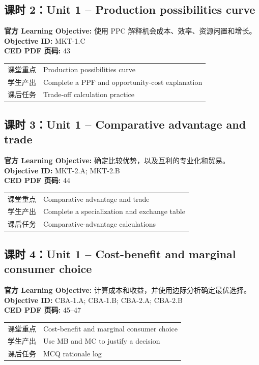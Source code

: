 \documentclass[11pt,a4paper]{ctexart}
\newcommand{\objectivebox}[1]{\noindent\colorbox{aplight}{\parbox{0.96\textwidth}{#1}}}
\begin{document}
\subsection{课时 2：Unit 1 -- Production possibilities curve}
\objectivebox{\textbf{官方 Learning Objective:} 使用 PPC 解释机会成本、效率、资源闲置和增长。\\\textbf{Objective ID:} MKT-1.C\\\textbf{CED PDF 页码:} 43}\par\vspace{0.4em}
\begin{tabularx}{\textwidth}{p{3.0cm}Y}
\toprule
课堂重点 & Production possibilities curve\\
学生产出 & Complete a PPF and opportunity-cost explanation\\
课后任务 & Trade-off calculation practice\\
\bottomrule
\end{tabularx}
\subsection{课时 3：Unit 1 -- Comparative advantage and trade}
\objectivebox{\textbf{官方 Learning Objective:} 确定比较优势，以及互利的专业化和贸易。\\\textbf{Objective ID:} MKT-2.A; MKT-2.B\\\textbf{CED PDF 页码:} 44}\par\vspace{0.4em}
\begin{tabularx}{\textwidth}{p{3.0cm}Y}
\toprule
课堂重点 & Comparative advantage and trade\\
学生产出 & Complete a specialization and exchange table\\
课后任务 & Comparative-advantage calculations\\
\bottomrule
\end{tabularx}
\subsection{课时 4：Unit 1 -- Cost-benefit and marginal consumer choice}
\objectivebox{\textbf{官方 Learning Objective:} 计算成本和收益，并使用边际分析确定最优选择。\\\textbf{Objective ID:} CBA-1.A; CBA-1.B; CBA-2.A; CBA-2.B\\\textbf{CED PDF 页码:} 45–47}\par\vspace{0.4em}
\begin{tabularx}{\textwidth}{p{3.0cm}Y}
\toprule
课堂重点 & Cost-benefit and marginal consumer choice\\
学生产出 & Use MB and MC to justify a decision\\
课后任务 & MCQ rationale log\\
\bottomrule
\end{tabularx}
\end{document}
